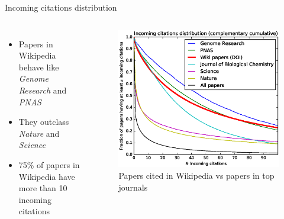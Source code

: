 \documentclass{beamer}
\begin{document}
\begin{frame}{Incoming citations distribution}
    \begin{columns}
        \begin{itemize}
            \item Papers in Wikipedia behave like \emph{Genome Research} and \emph{PNAS}
            \item They outclass \emph{Nature} and \emph{Science}
            \item 75\% of papers in Wikipedia have more than 10 incoming citations
        \end{itemize}
        \begin{figure}
        \centering
        \includegraphics[width=1\textwidth]{assets/incoming_citations_distribution_ccdf_slides}
        \caption{Papers cited in Wikipedia vs papers in top journals}
        \end{figure}
    \end{columns}
\end{frame}
\end{document}
